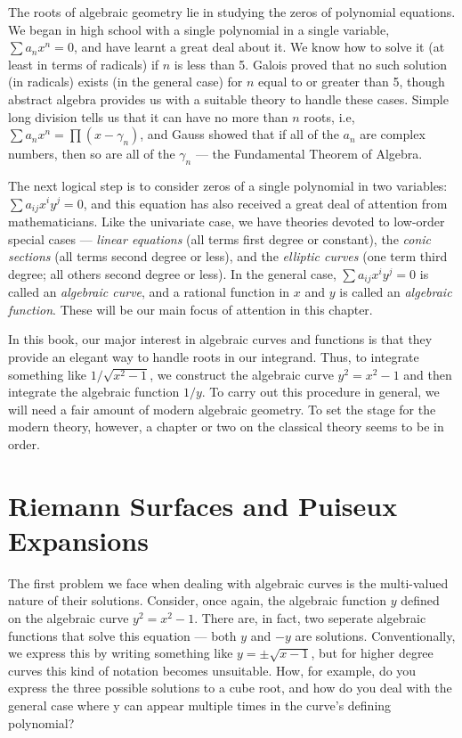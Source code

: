 The roots of algebraic geometry lie in studying the zeros of
polynomial equations.  We began in high school with a single
polynomial in a single variable, $\sum a_n x^n = 0$, and have learnt a
great deal about it.  We know how to solve it (at least in terms of
radicals) if $n$ is less than 5.  Galois proved that no such solution
(in radicals) exists (in the general case) for $n$ equal to or greater
than 5, though abstract algebra provides us with a suitable theory to
handle these cases.  Simple long division tells us that it can have no
more than $n$ roots, i.e, $\sum a_n x^n = \prod (x-\gamma_n)$, and
Gauss showed that if all of the $a_n$ are complex numbers, then so are
all of the $\gamma_n$ --- the Fundamental Theorem of Algebra.

The next logical step is to consider zeros of a single polynomial in
two variables: $\sum a_{ij} x^i y^j = 0$, and this equation has also
received a great deal of attention from mathematicians.  Like the
univariate case, we have theories devoted to low-order special cases
--- {\it linear equations} (all terms first degree or constant), the
{\it conic sections} (all terms second degree or less), and the {\it
elliptic curves} (one term third degree; all others second degree or
less).  In the general case, $\sum a_{ij} x^i y^j = 0$ is called an
{\it algebraic curve}, and a rational function in $x$ and $y$ is
called an {\it algebraic function}.  These will be our main focus of
attention in this chapter.

In this book, our major interest in algebraic curves and functions is
that they provide an elegant way to handle roots in our integrand.
Thus, to integrate something like $1/\sqrt{x^2-1}$, we construct the
algebraic curve $y^2 = x^2 - 1$ and then integrate the algebraic
function $1/y$.  To carry out this procedure in general, we will need a
fair amount of modern algebraic geometry.  To set the stage for the
modern theory, however, a chapter or two on the classical theory seems
to be in order.

\section{Riemann Surfaces and Puiseux Expansions}

The first problem we face when dealing with algebraic curves is the
multi-valued nature of their solutions.  Consider, once again, the
algebraic function $y$ defined on the algebraic curve $y^2 = x^2 - 1$.
There are, in fact, two seperate algebraic functions that solve this
equation --- both $y$ and $-y$ are solutions.  Conventionally, we
express this by writing something like $y = \pm\sqrt{x-1}$, but for
higher degree curves this kind of notation becomes unsuitable.  How,
for example, do you express the three possible solutions to a cube
root, and how do you deal with the general case where y can appear
multiple times in the curve's defining polynomial?

